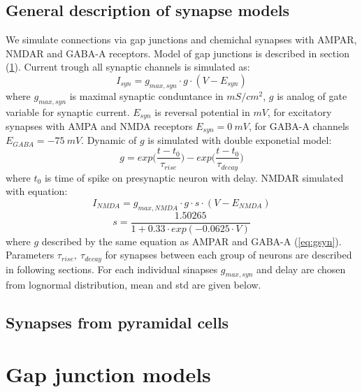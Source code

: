 \documentclass[a4paper,12pt]{article}
\begin{document}
\subsection{General description of synapse models} \label{synapse_models}
We simulate connections  via  gap junctions and chemichal synapses with AMPAR, NMDAR and GABA-A receptors. Model of gap junctions is described in  section (\ref{gap_junctions_models}).
Current trough all synaptic channels is simulated as:
\begin{equation}
I_{syn} = g_{max, syn} \cdot g \cdot (V - E_{syn})
\end{equation}
where $ g_{max, syn}$ is maximal synaptic conduntance in $mS/cm^2$, $g$ is analog of gate variable for synaptic current. $E_{syn}$ is reversal potential in $mV$, for excitatory synapses with AMPA and NMDA receptors $E_{syn} = 0\ mV$, for GABA-A channels $E_{GABA} = -75\ mV$.
Dynamic of $g$ is simulated with double exponetial model: 
\begin{equation}
\label{eq:gsyn}
g = exp \Big( \frac{t - t_0}{\tau_{rise}} \Big) - exp \Big( \frac{t - t_0}{\tau_{decay}} \Big)
\end{equation}
where $t_0$ is time of spike on presynaptic neuron with delay.
NMDAR simulated with equation:
\begin{equation}
I_{NMDA} = g_{max, NMDA} \cdot g \cdot s \cdot (V - E_{NMDA})
\end{equation}
\begin{equation}
s = \frac{1.50265}{1 + 0.33 \cdot exp(-0.0625 \cdot V) }
\end{equation}
where $g$ described by the same equation as AMPAR and GABA-A (\ref{eq:gsyn}).
Parameters $\tau_{rise},\ \tau_{decay}$ for synapses between each group of neurons are described in following sections. For each individual sinapses $g_{max, syn}$ and delay are chosen from lognormal distribution, mean and std are given below.  

\subsection{Synapses from pyramidal cells}












\section{Gap junction models} \label{gap_junctions_models}
\end{document}
